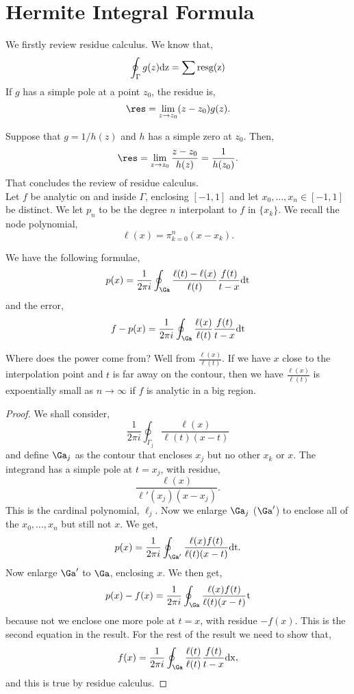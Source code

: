 
\section{Hermite Integral Formula}
We firstly review residue calculus. We know that,
$$ \oint_\Gamma g(z)\rm dz = \sum \mathrm{res} g(z)  $$
If $g$ has a simple pole at a point $z_0$, the residue is,
$$ \res = \lim_{z \to z_0} (z - z_0)g(z). $$

\noindent
Suppose that $g = 1/h(z)$ and $h$ has a simple zero at $z_0$. Then,
$$ \res = \lim_{z \to z_0} \frac{z - z_0}{h(z)} = \frac{1}{h(z_0)}. $$
That concludes the review of residue calculus. \\

\noindent
Let $f$ be analytic on and inside $\Gamma$, enclosing $[-1, 1]$ and let $x_0, \dots, x_n \in [-1, 1]$ be distinct. We let $p_n$ to be the degree $n$ interpolant to $f$ in $\{x_k\}$. We recall the node polynomial,
$$ \ell(x) = \pi_{k=0}^n (x - x_k). $$

\begin{nthm}[]
  We have the following formulae,
  $$ p(x) = \frac{1}{2\pi i}\oint_\Ga \frac{\ell(t) - \ell(x)}{\ell(t)} \frac{f(t)}{t - x} \rm d t $$
  and the error,
  $$ f - p(x) = \frac{1}{2\pi i}\oint_\Ga \frac{\ell(x)}{\ell(t)} \frac{f(t)}{t - x}\rm d t $$
\end{nthm}
\noindent
Where does the power come from? Well from $\frac{\ell(x)}{\ell(t)}$. If we have $x$ close to the interpolation point and $t$ is far away on the contour, then we have $\frac{\ell(x)}{\ell(t)}$ is expoentially small as $n \to \infty$ if $f$ is analytic in a big region.

\begin{proof}
  We shall consider,
  $$ \frac{1}{2\pi i}\oint_{\Gamma_j} \frac{\ell(x)}{\ell(t)(x - t)} $$
  and define $\Ga_j$ as the contour that encloses $x_j$ but no other $x_k$ or $x$. The integrand has a simple pole at $t = x_j$, with residue,
  $$ \frac{\ell(x)}{\ell'(x_j)(x - x_j)}. $$
  This is the cardinal polynomial, $\ell_j$. Now we enlarge $\Ga_j$ ($\Ga'$) to enclose all of the $x_0, \dots, x_n$ but still not $x$. We get,
  $$ p(x) = \frac{1}{2\pi i}\oint_{\Ga'} \frac{\ell(x)f(t)}{\ell(t) (x - t)}\rm d t. $$
  Now enlarge $\Ga'$ to $\Ga$, enclosing $x$. We then get,
  $$ p(x) - f(x) = \frac{1}{2\pi i}\oint_\Ga \frac{\ell(x)f(t)}{\ell(t)(x - t)}\rm t $$
  because not we enclose one more pole at $t = x$, with residue $-f(x)$. This is the second equation in the result. For the rest of the result we need to show that,
  $$ f(x) = \frac{1}{2\pi i}\oint_\Ga \frac{\ell(t)}{\ell(t)} \frac{f(t)}{t - x}\rm dx, $$
  and this is true by residue calculus.
\end{proof}